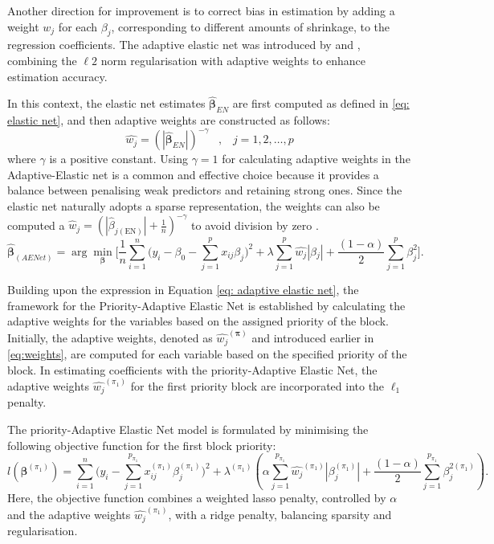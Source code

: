 Another direction for improvement is to correct bias in estimation by adding a weight $w_j$ for each $\beta_j$, corresponding to different amounts of shrinkage, to the regression coefficients.
The adaptive elastic net was introduced by \citet{zou2009adaptive} and \citet{Ghoshadaptiveelastic}, combining the $\ell2$ norm regularisation with adaptive weights to enhance estimation accuracy.

In this context, the elastic net estimates $\hat{\bm{\beta}}_{EN}$ are first computed as defined in \eqref{eq: elastic net}, and then adaptive weights are constructed as follows: 
\begin{equation}
\label{eq:weights}
\hat{w_{j}}=(|\hat{\bm{\beta}}_{EN}|)^{-\gamma}\;\;\;,\;\;\;
 j = 1, 2,  \ldots, p
 \end{equation}
\noindent where $\gamma$ is a positive constant.
Using $\gamma=1$ for calculating adaptive weights in the Adaptive-Elastic net is a common and effective choice because it provides a balance between penalising weak predictors and retaining strong ones.  Since the elastic net naturally adopts a sparse representation, the weights can also be computed a $\hat{w}_j = \left( |\hat{\beta}_{j(\text{EN})}| + \frac{1}{n} \right)^{-\gamma}$ to avoid division by zero \citep{zou2009adaptive}. 
\begin{equation}
\label{eq: adaptive elastic net}
\hat{\bm{\beta}}_{(AENet)} = \arg \min_{\bm{\beta}} \Bigg[ \frac{1}{n}\sum\limits_{i=1}^{n}\bigg(y_i- \beta_{0}- \sum\limits_{j=1}^{p}x_{ij}\beta_j\bigg)^2 +\lambda\sum_{j=1}^p \hat{w_{j}}|\beta{_j}| + \frac{(1 - \alpha)}{2} \sum_{j=1}^{p} \beta_{j}^{2} 
\Bigg].
\end{equation}

Building upon the expression in Equation \eqref{eq: adaptive elastic net}, the framework for the Priority-Adaptive Elastic Net is established by calculating the adaptive weights for the variables based on the assigned priority of the block. Initially, the adaptive weights, denoted as \(\hat{w_j}^{(\bm{\pi})}\) and introduced earlier in \eqref{eq:weights}, are computed for each variable based on the specified priority of the block. In estimating coefficients with the priority-Adaptive Elastic Net, the adaptive weights $\hat{w_j}^{(\pi_1)}$ for the first priority block are incorporated into the $\ell_1$ penalty.

The priority-Adaptive Elastic Net model is formulated by minimising the following objective function for the first block priority:
\begin{equation}
\label{eq:Priority-Elastic}
l(\bm{\beta}^{(\pi_1)}) = \sum_{i=1}^{n}\bigg(y_i - \sum_{j=1}^{p_{\pi_1}}x_{ij}^{(\pi_1)}\beta_j^{(\pi_1)}\bigg)^2 
+ \lambda^{(\pi_1)} \left(\alpha \sum_{j=1}^{p_{\pi_1}} \hat{w_j}^{(\pi_1)}|\beta^{(\pi_1)}_j| 
+ \frac{(1 - \alpha)}{2} \sum_{j=1}^{p_{\pi_1}} \beta_{j}^{2 (\pi_1)} \right).
\end{equation}
Here, the objective function combines a weighted lasso penalty, controlled by $\alpha$ and the adaptive weights $\hat{w_j}^{(\pi_1)}$, with a ridge penalty, balancing sparsity and regularisation.

